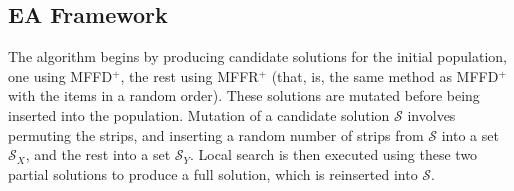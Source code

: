 \documentclass{elsarticle}
\begin{document}
\begin{comment}
{\color{myRed}
\begin{itemize}[leftmargin=*]
	\item
	\idone{Purpose of local search, takes two partial solutions $\mathcal{S}_X$ and $\mathcal{S}_Y$.}
	\idone{Initially permute strips.}
	\idone{4 stages, 3 swap, 1 move. width of items from $\mathcal{S}_X$ must be less than width of items from $\mathcal{S}_Y$ in first three stages.}
	\idone{Moves smaller items into $\mathcal{S}_Y$, larger items into $\mathcal{S}_X$.}
	\idone{If swap/move performed, move onto next stage. Repeat until no changes to either partial solution.}
	\idone{MFFD$^+$ applied on items in $\mathcal{S}_Y$ to produce partial solution $\mathcal{S}_Y'$. Then strips from $\mathcal{S}_X$ and $\mathcal{S}_Y'$ inserted into $\mathcal{S}$ (this is not necessarily offspring).}
	\idone{Based on dominance criterion of Martello and Toth \cite{martello1990l}.}
	\idone{If strip $S_1$ dominates $S_2$, the a solution using $S_1$ will have no more strips than a solution using $S_2$.}
	\idone{Aim - increase fullness of strips in $\mathcal{S}_X$ while maintaining or decreasing number of items on strips.}
	\idone{Moves smaller items into $\mathcal{S}_Y$, easier to repack in stage (4).}
	\idone{Variations of procedure seen in Falkenauer \cite{falkenauer1996}, Lewis \cite{lewis2009} \cite{lewis2017}, Levine \cite{levine2004}.}
	\idone{VSC makes swaps/moves more difficult, this means local search takes longer, fewer swaps than seen in \cite{lewis2009}, \cite{lewis2017}, \cite{levine2004}, \cite{falkenauer1996} (check).}
	\idone{Repeating process produces different combinations of items, more possibilities to find feasible ordering.}
	\idone{Well-filled strips with larger items preferable over less-filled strips with smaller items (Levine \cite{levine2004}).}
\end{itemize}
}
\end{comment}

\subsection{EA Framework}
\label{sub:eaframework}
\noindent The algorithm begins by producing candidate solutions for the initial population, one using MFFD$^+$, the rest using MFFR$^+$ (that, is, the same method as MFFD$^+$ with the items in a random order). These solutions are mutated before being inserted into the population. Mutation of a candidate solution $\mathcal{S}$ involves permuting the strips, and inserting a random number of strips from $\mathcal{S}$ into a set $\mathcal{S}_X$, and the rest into a set $\mathcal{S}_Y$. Local search is then executed using these two partial solutions to produce a full solution, which is reinserted into $\mathcal{S}$. 
\end{document}

